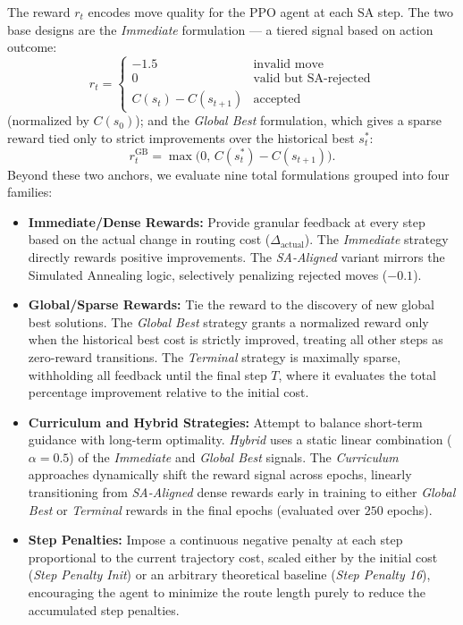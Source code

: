 \documentclass[letterpaper]{article} %
\begin{document}
The reward $r_t$ encodes move quality for the PPO agent at each SA step. The two base designs are the \textit{Immediate} formulation — a tiered signal based on action outcome:
\begin{equation}
    r_t = \begin{cases} -1.5 & \text{invalid move} \\ 0 & \text{valid but SA-rejected} \\ C(s_t) - C(s_{t+1}) & \text{accepted} \end{cases}
\end{equation}
(normalized by $C(s_0)$); and the \textit{Global Best} formulation, which gives a sparse reward tied only to strict improvements over the historical best $s^*_t$:
\begin{equation}
    r_t^{\text{GB}} = \max\!\big(0,\, C(s^*_t) - C(s_{t+1})\big).
\end{equation}
Beyond these two anchors, we evaluate nine total formulations grouped into four families:
\begin{itemize}
    \item \textbf{Immediate/Dense Rewards:} Provide granular feedback at every step based on the actual change in routing cost ($\Delta_{\text{actual}}$). The \textit{Immediate} strategy directly rewards positive improvements. The \textit{SA-Aligned} variant mirrors the Simulated Annealing logic, selectively penalizing rejected moves ($-0.1$).
    \item \textbf{Global/Sparse Rewards:} Tie the reward to the discovery of new global best solutions. The \textit{Global Best} strategy grants a normalized reward only when the historical best cost is strictly improved, treating all other steps as zero-reward transitions. The \textit{Terminal} strategy is maximally sparse, withholding all feedback until the final step $T$, where it evaluates the total percentage improvement relative to the initial cost.
    \item \textbf{Curriculum and Hybrid Strategies:} Attempt to balance short-term guidance with long-term optimality. \textit{Hybrid} uses a static linear combination ($\alpha = 0.5$) of the \textit{Immediate} and \textit{Global Best} signals. The \textit{Curriculum} approaches dynamically shift the reward signal across epochs, linearly transitioning from \textit{SA-Aligned} dense rewards early in training to either \textit{Global Best} or \textit{Terminal} rewards in the final epochs (evaluated over $250$ epochs).
    \item \textbf{Step Penalties:} Impose a continuous negative penalty at each step proportional to the current trajectory cost, scaled either by the initial cost (\textit{Step Penalty Init}) or an arbitrary theoretical baseline (\textit{Step Penalty 16}), encouraging the agent to minimize the route length purely to reduce the accumulated step penalties.
\end{itemize}
\end{document}
